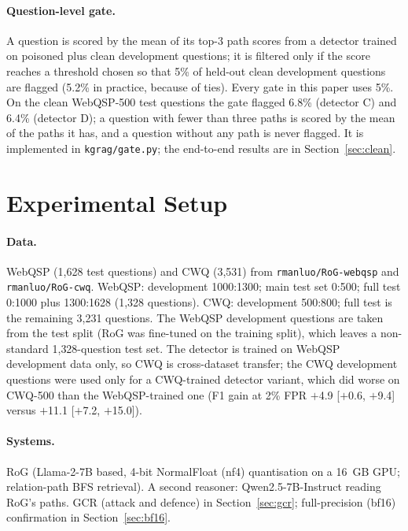 \documentclass[preprint,12pt]{elsarticle}
\begin{document}
\paragraph{Question-level gate.} A question is scored by the mean of its top-3 path scores from a detector trained on poisoned plus clean development questions; it is filtered only if the score reaches a threshold chosen so that 5\% of held-out clean development questions are flagged (5.2\% in practice, because of ties). Every gate in this paper uses 5\%. On the clean WebQSP-500 test questions the gate flagged 6.8\% (detector C) and 6.4\% (detector D); a question with fewer than three paths is scored by the mean of the paths it has, and a question without any path is never flagged. It is implemented in \texttt{kgrag/gate.py}; the end-to-end results are in Section~\ref{sec:clean}.

\section{Experimental Setup}\label{sec:setup}
\paragraph{Data.} WebQSP (1{,}628 test questions) and CWQ (3{,}531) from \texttt{rmanluo/RoG-webqsp} and \texttt{rmanluo/RoG-cwq}. WebQSP: development 1000:1300; main test set 0:500; full test 0:1000 plus 1300:1628 (1{,}328 questions). CWQ: development 500:800; full test is the remaining 3{,}231 questions. The WebQSP development questions are taken from the test split (RoG was fine-tuned on the training split), which leaves a non-standard 1{,}328-question test set. The detector is trained on WebQSP development data only, so CWQ is cross-dataset transfer; the CWQ development questions were used only for a CWQ-trained detector variant, which did worse on CWQ-500 than the WebQSP-trained one (F1 gain at 2\% FPR $+$4.9 [$+$0.6, $+$9.4] versus $+$11.1 [$+$7.2, $+$15.0]).

\paragraph{Systems.} RoG (Llama-2-7B based, 4-bit NormalFloat (nf4) quantisation on a 16~GB GPU; relation-path BFS retrieval). A second reasoner: Qwen2.5-7B-Instruct reading RoG's paths. GCR (attack and defence) in Section~\ref{sec:gcr}; full-precision (bf16) confirmation in Section~\ref{sec:bf16}.
\end{document}
